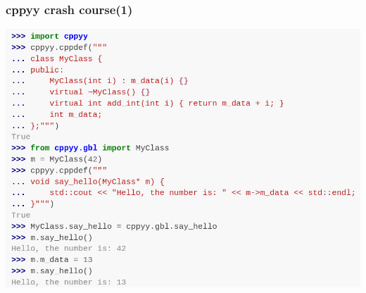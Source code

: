 \begin{frame}
  \frametitle{cppyy crash course(1)}
  \includegraphics[trim={0 0 0 2.45cm},clip,width=\textwidth]{cppyy.png}
\end{frame}

